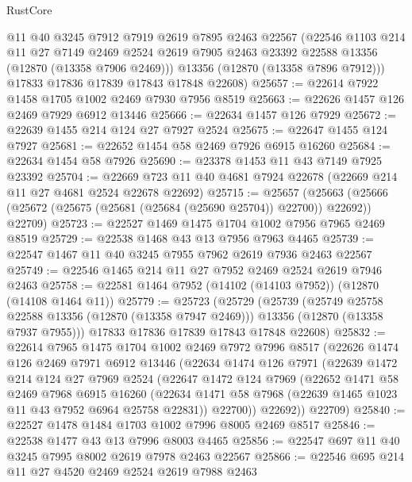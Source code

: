 \begin{lexlean}{RustCore}
\begin{coremodule}
        @11
        @40
        @3245
        @7912
        @7919
        @2619
        @7895
        @2463
        @22567
        (@22546
          @1103
          @214
          @11
          @27
          @7149
          @2469
          @2524
          @2619
          @7905
          @2463
          @23392
          @22588
          @13356
          (@12870 (@13358 @7906 @2469)))
        @13356
        (@12870 (@13358 @7896 @7912)))
      @17833
      @17836
      @17839
      @17843
      @17848
      @22608)
@25657 := @22614 @7922 @1458 @1705 @1002 @2469 @7930 @7956 @8519
@25663 := @22626 @1457 @126 @2469 @7929 @6912 @13446
@25666 := @22634 @1457 @126 @7929
@25672 := @22639 @1455 @214 @124 @27 @7927 @2524
@25675 := @22647 @1455 @124 @7927
@25681 := @22652 @1454 @58 @2469 @7926 @6915 @16260
@25684 := @22634 @1454 @58 @7926
@25690 := @23378 @1453 @11 @43 @7149 @7925 @23392
@25704 := @22669 @723 @11 @40 @4681 @7924 @22678 (@22669 @214 @11 @27 @4681 @2524 @22678 @22692)
@25715 := @25657
    (@25663 (@25666 (@25672 (@25675 (@25681 (@25684 (@25690 @25704)) @22700)) @22692)) @22709)
@25723 := @22527 @1469 @1475 @1704 @1002 @7956 @7965 @2469 @8519
@25729 := @22538 @1468 @43 @13 @7956 @7963 @4465
@25739 := @22547 @1467 @11 @40 @3245 @7955 @7962 @2619 @7936 @2463 @22567
@25749 := @22546 @1465 @214 @11 @27 @7952 @2469 @2524 @2619 @7946 @2463
@25758 := @22581 @1464 @7952 (@14102 (@14103 @7952)) (@12870 (@14108 @1464 @11))
@25779 := @25723
    (@25729
      (@25739
        (@25749 @25758 @22588 @13356 (@12870 (@13358 @7947 @2469)))
        @13356
        (@12870 (@13358 @7937 @7955)))
      @17833
      @17836
      @17839
      @17843
      @17848
      @22608)
@25832 := @22614
    @7965
    @1475
    @1704
    @1002
    @2469
    @7972
    @7996
    @8517
    (@22626
      @1474
      @126
      @2469
      @7971
      @6912
      @13446
      (@22634
        @1474
        @126
        @7971
        (@22639
          @1472
          @214
          @124
          @27
          @7969
          @2524
          (@22647
            @1472
            @124
            @7969
            (@22652
              @1471
              @58
              @2469
              @7968
              @6915
              @16260
              (@22634 @1471 @58 @7968 (@22639 @1465 @1023 @11 @43 @7952 @6964 @25758 @22831))
              @22700))
          @22692))
      @22709)
@25840 := @22527 @1478 @1484 @1703 @1002 @7996 @8005 @2469 @8517
@25846 := @22538 @1477 @43 @13 @7996 @8003 @4465
@25856 := @22547 @697 @11 @40 @3245 @7995 @8002 @2619 @7978 @2463 @22567
@25866 := @22546 @695 @214 @11 @27 @4520 @2469 @2524 @2619 @7988 @2463

\end{coremodule}
\end{lexlean}
